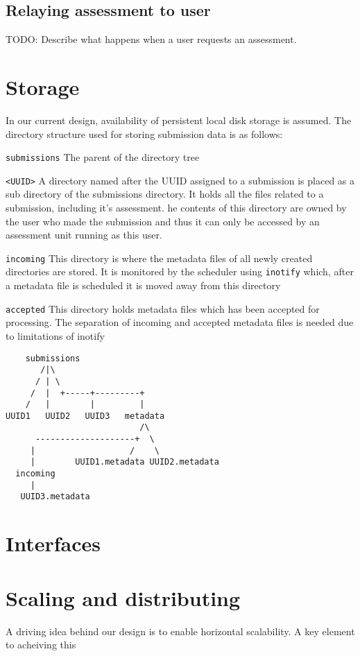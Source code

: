 \subsection{Relaying assessment to user}
TODO: Describe what happens when a user requests an assessment.

\section{Storage}
In our current design, availability of persistent local disk storage
is assumed. The directory structure used for storing submission data
is as follows:

\begin{description}
\item{\texttt{submissions}} The parent of the directory tree
\item{\texttt{<UUID>}} A directory named after the UUID assigned to
  a submission is placed as a sub directory of the submissions
  directory. It holds all the files related to a submission, including
  it's assessment.  he contents of this directory are owned by the user
  who made the submission and thus it can only be accessed by an
  assessment unit running as this user.
\item{\texttt{incoming}} This directory is where the metadata files of
  all newly created directories are stored. It is monitored by the
  scheduler using \texttt{inotify} which, after a metadata file is
  scheduled it is moved away from this directory
\item{\texttt{accepted}} This directory holds metadata files which has
  been accepted for processing. The separation of incoming and
  accepted metadata files is needed due to limitations of inotify 
\end{description}

\begin{verbatim}
    submissions
       /|\
      / | \
     /  |  +-----+---------+
    /   |        |         |
UUID1   UUID2   UUID3   metadata
                           /\
      --------------------+  \
     |                   /    \
     |        UUID1.metadata UUID2.metadata
  incoming
     |
   UUID3.metadata

\end{verbatim}


\section{Interfaces}


\section{Scaling and distributing}
A driving idea behind our design is to enable horizontal
scalability. A key element to acheiving this


